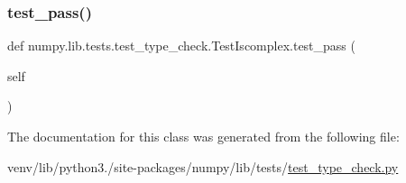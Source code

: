 \mbox{\label{classnumpy_1_1lib_1_1tests_1_1test__type__check_1_1TestIscomplex_afcdb92a141109563b0a023dba8e38e4f}} 
\subsubsection{\texorpdfstring{test\+\_\+pass()}{test\_pass()}}
{\footnotesize\ttfamily def numpy.\+lib.\+tests.\+test\+\_\+type\+\_\+check.\+Test\+Iscomplex.\+test\+\_\+pass (\begin{DoxyParamCaption}\item[{}]{self }\end{DoxyParamCaption})}



The documentation for this class was generated from the following file\+:\begin{DoxyCompactItemize}
\item 
venv/lib/python3./site-\/packages/numpy/lib/tests/\hyperlink{test__type__check_8py}{test\+\_\+type\+\_\+check.\+py}\end{DoxyCompactItemize}
